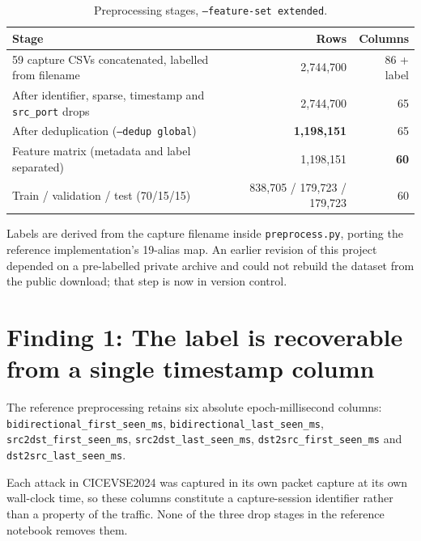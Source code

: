 \documentclass[11pt, a4paper]{article}
\newcommand{\repro}[1]{\par\smallskip{\footnotesize\textcolor{darkgray}{%
    \textbf{Reproduce:} \texttt{#1}}}\par}
\newcommand{\col}[1]{\texttt{\small #1}}
\begin{document}
\begin{table}[h]
\centering
\caption{Preprocessing stages, \texttt{--feature-set extended}.}
\begin{tabular}{lrr}
\toprule
\textbf{Stage} & \textbf{Rows} & \textbf{Columns} \\
\midrule
59 capture CSVs concatenated, labelled from filename      & 2{,}744{,}700 & 86 + label \\
After identifier, sparse, timestamp and \col{src\_port} drops & 2{,}744{,}700 & 65 \\
After deduplication (\texttt{--dedup global})              & \textbf{1{,}198{,}151} & 65 \\
Feature matrix (metadata and label separated)              & 1{,}198{,}151 & \textbf{60} \\
Train / validation / test (70/15/15)                       & 838{,}705 / 179{,}723 / 179{,}723 & 60 \\
\bottomrule
\end{tabular}
\end{table}
\repro{make data-process}

\medskip
\noindent
Labels are derived from the capture filename inside \col{preprocess.py}, porting
the reference implementation's 19-alias map. An earlier revision of this project
depended on a pre-labelled private archive and could not rebuild the dataset from
the public download; that step is now in version control.

\section{Finding 1: The label is recoverable from a single timestamp column}

The reference preprocessing retains six absolute epoch-millisecond columns:
\col{bidirectional\_first\_seen\_ms}, \col{bidirectional\_last\_seen\_ms},
\col{src2dst\_first\_seen\_ms}, \col{src2dst\_last\_seen\_ms},
\col{dst2src\_first\_seen\_ms} and \col{dst2src\_last\_seen\_ms}.

Each attack in CICEVSE2024 was captured in its own packet capture at its own
wall-clock time, so these columns constitute a capture-session identifier rather
than a property of the traffic. None of the three drop stages in the reference
notebook removes them.
\end{document}

